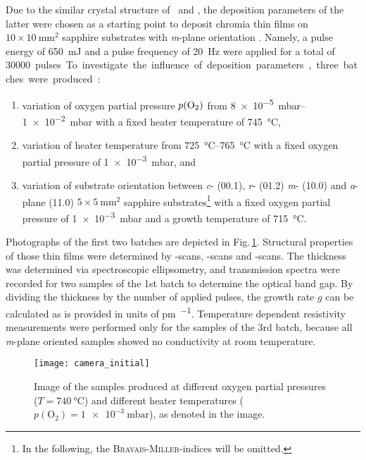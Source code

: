 Due to the similar crystal structure of \cro\ and \agao, the deposition parameters of the latter were chosen as a starting point to deposit chromia thin films on $10\times\qty{10}{\mm\squared}$ sapphire substrates with \textit{m}-plane orientation
    \cite{petersen2023}.
Namely, a pulse energy of \qty{650}{mJ} and a pulse frequency of \qty{20}{\Hz} were applied for a total of \qty{30000} pulses.
To investigate the influence of deposition parameters, three batches were produced:
\begin{enumerate}
    \item variation of oxygen partial pressure $p(\ce{O2})$ from \qtyrange{8e-5}{1e-2}{mbar} with a fixed heater temperature of \qty{745}{\degreeCelsius},
    \item variation of heater temperature from \qtyrange{725}{765}{\degreeCelsius} with a fixed oxygen partial pressure of \qty{1e-3}{mbar}, and
    \item variation of substrate orientation between \textit{c}- (00.1), \textit{r}- (01.2) \textit{m}- (10.0) and \textit{a}-plane (11.0) $5\times\qty{5}{\mm\squared}$ sapphire substrates\footnote{
        In the following, the \textsc{Bravais}-\textsc{Miller}-indices will be omitted.
        }
    with a fixed oxygen partial pressure of \qty{1e-3}{mbar} and a growth temperature of \qty{715}{\degreeCelsius}.
\end{enumerate}
Photographs of the first two batches are depicted in Fig.\,\ref{Fig:Results_1_samplesPhoto}.
Structural properties of those thin films were determined by \thetaomega-scans, \textomega-scans and \textphi-scans.
The thickness was determined via spectroscopic ellipsometry, and transmission spectra were recorded for two samples of the 1st batch to determine the optical band gap.
By dividing the thickness by the number of applied pulses, the growth rate $g$ can be calculated as is provided in units of \unit{\pm\per\pulse}.
Temperature dependent resistivity measurements were performed only for the samples of the 3rd batch, because all \textit{m}-plane oriented samples showed no conductivity at room temperature.

\begin{figure}
    \centering
    \texttt{[image: camera\_initial]}
    \caption{
        Image of the samples produced at different oxygen partial pressures ($T=\qty{740}{\degreeCelsius}$) and different heater temperatures ($p(\mathrm{O_2})=\qty{1e-3}{\milli\bar}$), as denoted in the image.
    }
    \label{Fig:Results_1_samplesPhoto}
\end{figure}
